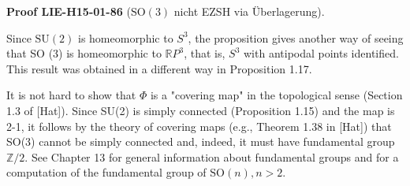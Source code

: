 \documentclass[10pt, letterpaper]{article}
\newcommand{\SO}{\mathrm{SO}}
\newcommand{\CustomHeading}[3]{%
  \par\medskip\noindent%
  \textbf{#1 #2} \textnormal{(#3)}.\enskip%
}
\newenvironment{PROOF}[2]{\begin{unitbox}\CustomHeading{Proof}{#1}{#2}}{\end{unitbox}}
\begin{document}
\begin{PROOF}{LIE-H15-01-86}{$\SO(3)$ nicht EZSH via Überlagerung}
Since $\mathrm{SU}(2)$ is homeomorphic to $S^{3}$, the proposition gives another way of seeing that SO (3) is homeomorphic to $\mathbb{R} P^{3}$, that is, $S^{3}$ with antipodal points identified. This result was obtained in a different way in Proposition 1.17.

It is not hard to show that $\Phi$ is a "covering map" in the topological sense (Section 1.3 of [Hat]). Since SU(2) is simply connected (Proposition 1.15) and the map is 2-1, it follows by the theory of covering maps (e.g., Theorem 1.38 in [Hat]) that SO(3) cannot be simply connected and, indeed, it must have fundamental group $\mathbb{Z} / 2$. See Chapter 13 for general information about fundamental groups and for a computation of the fundamental group of $\mathrm{SO}(n), n>2$.
\end{PROOF}
\end{document}

